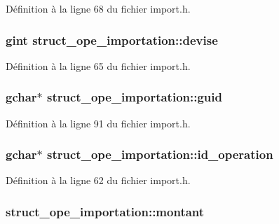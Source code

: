 Définition à la ligne 68 du fichier import.h.

\subsubsection[{devise}]{\setlength{\rightskip}{0pt plus 5cm}gint {\bf struct\_\-ope\_\-importation::devise}}\label{structstruct__ope__importation_ac3ee087af86e925117eaa97d036e626a}


Définition à la ligne 65 du fichier import.h.

\subsubsection[{guid}]{\setlength{\rightskip}{0pt plus 5cm}gchar$\ast$ {\bf struct\_\-ope\_\-importation::guid}}\label{structstruct__ope__importation_ad734dc36c77cdbd23941f570f0a7d90d}


Définition à la ligne 91 du fichier import.h.

\subsubsection[{id\_\-operation}]{\setlength{\rightskip}{0pt plus 5cm}gchar$\ast$ {\bf struct\_\-ope\_\-importation::id\_\-operation}}\label{structstruct__ope__importation_a9117942cf1ba68459e85803c55420dd0}


Définition à la ligne 62 du fichier import.h.

\subsubsection[{montant}]{ {\bf struct\_\-ope\_\-importation::montant}}\label{structstruct__ope__importation_a6eb3906974bf127228cb61ca9ea1389f}


